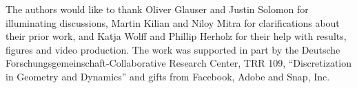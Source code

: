 \documentclass[acmtog]{acmart}
\begin{document}



\maketitle








\begin{acks}
The authors would like to thank Oliver Glauser and Justin Solomon for illuminating discussions,  Martin Kilian and Niloy Mitra for clarifications about their prior work, and Katja Wolff and Phillip Herholz for their help with results, figures and video production. The work was supported in part by the Deutsche Forschungsgemeinschaft-Collaborative Research Center, TRR 109, ``Discretization in Geometry and Dynamics'' and gifts from Facebook, Adobe and Snap, Inc.
\end{acks}




\appendix
\end{document}
